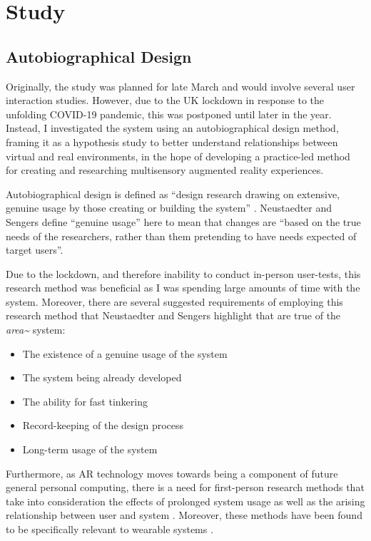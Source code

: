 \section{Study}                                 \label{sec: area-study}
\subsection{Autobiographical Design}            \label{sec: area-study-abd}
Originally, the study was planned for late March and would involve several user interaction studies. However, due to the UK lockdown in response to the unfolding COVID-19 pandemic, this was postponed until later in the year. Instead, I investigated the system using an autobiographical design method, framing it as a hypothesis study to better understand relationships between virtual and real environments, in the hope of developing a practice-led method for creating and researching multisensory augmented reality experiences. 

Autobiographical design is defined as “design research drawing on extensive, genuine usage by those creating or building the system” \citep{neustaedter2012}. Neustaedter and Sengers define “genuine usage” here to mean that changes are “based on the true needs of the researchers, rather than them pretending to have needs expected of target users”.

Due to the lockdown, and therefore inability to conduct in-person user-tests, this research method was beneficial as I was spending large amounts of time with the system. Moreover, there are several suggested requirements of employing this research method that Neustaedter and Sengers highlight that are true of the \textit{area\textasciitilde{}} system:
\begin{itemize}
    \item The existence of a genuine usage of the system
    \item The system being already developed
    \item The ability for fast tinkering 
    \item Record-keeping of the design process
    \item Long-term usage of the system
\end{itemize}
Furthermore, as AR technology moves towards being a component of future general personal computing, there is a need for first-person research methods that take into consideration the effects of prolonged system usage as well as the arising relationship between user and system \citep{desjardins2018}. Moreover, these methods have been found to be specifically relevant to wearable systems \citep{cecchinato2017}.


